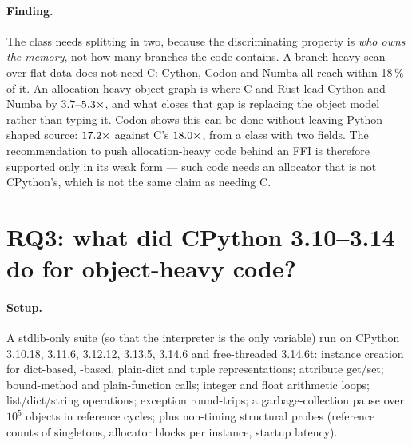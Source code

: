 \paragraph{Finding.} The class needs splitting in two, because the discriminating property is
\emph{who owns the memory}, not how many branches the code contains. A branch-heavy scan over
flat data does not need C: Cython, Codon and Numba all reach within 18\,\% of it. An
allocation-heavy object graph is where C and Rust lead Cython and Numba by $3.7$--$\meas{ratio:b2_branchy-314:binarytrees/numba|b2_branchy-314:binarytrees/rust_ctypes}{5.3}\times$,
and what closes that gap is replacing the object model rather than typing it. Codon shows this
can be done without leaving Python-shaped source: $\meas{ratio:b2_branchy-314:binarytrees/cpython_loop|b2_branchy-314:binarytrees/codon_pyext}{17.2}\times$ against C's $\meas{ratio:b2_branchy-314:binarytrees/cpython_loop|b2_branchy-314:binarytrees/c_ctypes}{18.0}\times$, from a
class with two  fields.
The recommendation to push allocation-heavy code behind an FFI is therefore supported only in
its weak form --- such code needs an allocator that is not CPython's, which is not the same
claim as needing C.

\section{RQ3: what did CPython 3.10--3.14 do for object-heavy code?}
\label{sec:rq3}


\paragraph{Setup.} A stdlib-only suite (so that the interpreter is the only variable) run
on CPython 3.10.18, 3.11.6, 3.12.12, 3.13.5, 3.14.6 and free-threaded 3.14.6t: instance
creation for dict-based, -based, plain-dict and tuple representations;
attribute get/set; bound-method and plain-function calls; integer and float arithmetic
loops; list/dict/string operations; exception round-trips; a garbage-collection pause over
$10^5$ objects in reference cycles; plus non-timing structural probes (reference counts of
singletons, allocator blocks per instance, startup latency).

